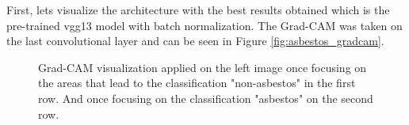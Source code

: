 First, lets visualize the architecture with the best results obtained which is the pre-trained vgg13 model with batch normalization. The Grad-CAM was taken on the last convolutional layer and can be seen in Figure \ref{fig:asbestos_gradcam}. 

\begin{figure}[H]
\centering
\caption{Grad-CAM visualization applied on the left image once focusing on the areas that lead to the classification "non-asbestos" in the first row. And once focusing on the classification "asbestos" on the second row.}


\end{figure}
